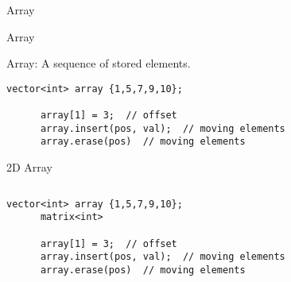 \begin{frame}{}
  \centerline{\Large Array}
\end{frame}

\begin{frame}[fragile]{Array}
  \centerline{Array: A sequence of  stored elements.}


  \pause
  \begin{lstlisting}[style = CStyle]
      vector<int> array {1,5,7,9,10};

      array[1] = 3;  // offset
      array.insert(pos, val);  // moving elements
      array.erase(pos)  // moving elements
  \end{lstlisting}
\end{frame}

\begin{frame}[fragile]{2D Array}
  \begin{columns}
    \pause
  \end{columns}

  \pause
  \begin{lstlisting}[style = CStyle]
      vector<int> array {1,5,7,9,10};
      matrix<int>

      array[1] = 3;  // offset
      array.insert(pos, val);  // moving elements
      array.erase(pos)  // moving elements
  \end{lstlisting}
\end{frame}
